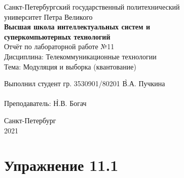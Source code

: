 \documentclass[a4paper, 14pt]{extarticle}
\begin{document}
    \begin{center}
        \begin{center}
            \hfill \break
            \normalsize{Санкт-Петербургский государственный политехнический}\\
            \normalsize{университет Петра Великого}\\
            \hfill \break
            \normalsize{\textbf{Высшая школа интеллектуальных систем и}}\\
            \normalsize{\textbf{суперкомпьютерных технологий}}\\
            \hfill \break
            \hfill \break
            \hfill \break
            \hfill \break
            \hfill \break
            \normalsize{Отчёт по лабораторной работе №11}\\
            \normalsize{Дисциплина: Телекоммуникационные технологии}\\
            \normalsize{Тема: Модуляция и выборка (квантование)}\\
        \end{center}
        \hfill \break
        \hfill \break
        \hfill \break
        \hfill \break
        \hfill \break
        \hfill \break
        \hfill \break
        \hfill \break
        \hfill \break
        \hfill \break
        \begin{tabbing}
            Выполнил студент гр. 3530901/80201 \`В.А. Пучкина\\
            \\
            Преподаватель: \`Н.В. Богач\\
        \end{tabbing}
        \hfill \break
        \hfill \break
        \hfill \break
        \hfill \break
        \begin{center}
            Санкт-Петербург\\
            2021
        \end{center}
        \thispagestyle{empty}
    \end{center}

    \newpage
    \tableofcontents

    \newpage
    \listoffigures

    \newpage
    \lstlistoflistings

    \newpage
    \section{Упражнение 11.1}
    \label{sec:task1}
\end{document}
